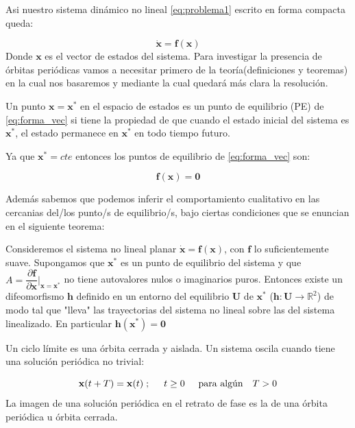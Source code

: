 \documentclass[10pt]{article}
\begin{document}
Asi nuestro sistema dinámico no lineal \eqref{eq:problema1} escrito en forma compacta queda:

\begin{equation}
 \dot{\mathbf{x}}=\mathbf{f}(\mathbf{x}) \label{eq:forma_vec}
\end{equation}
Donde $\mathbf{x}$ es el vector de estados del sistema.
Para investigar la presencia de órbitas periódicas vamos a necesitar primero de la teoría(definiciones y teoremas) en la cual nos basaremos y mediante la cual quedará más clara la resolución.

\begin{defi}
 Un punto $\mathbf{x}=\mathbf{x}^{*}$ en el espacio de estados es un punto de equilibrio (PE) de \eqref{eq:forma_vec} si tiene la propiedad de 
que cuando el estado inicial del sistema es $\mathbf{x}^{*}$, el estado permanece en $\mathbf{x}^{*}$ en todo tiempo futuro.
\end{defi}

Ya que $\mathbf{x}^{*}=cte$ entonces los puntos de equilibrio de \eqref{eq:forma_vec} son:

\begin{equation}
 \mathbf{f}(\mathbf{x})=\mathbf{0} \label{eq:pe}
\end{equation}

Además sabemos que podemos inferir el comportamiento cualitativo en las cercanias del/los punto/s de equilibrio/s, bajo ciertas condiciones 
que se enuncian en el siguiente teorema:

\begin{teo}

Consideremos el sistema no lineal planar $ \dot{\mathbf{x}}=\mathbf{f}(\mathbf{x})$, con $\mathbf{f}$ lo suficientemente suave. Supongamos que $\mathbf{x}^{*}$
es un punto de equilibrio del sistema y que $A=\dfrac{\partial \mathbf{f}}{\partial \mathbf{x}}\bigg\vert_{\mathbf{x}=\mathbf{x}^{*}}$ no tiene autovalores
nulos o imaginarios puros. Entonces existe un difeomorfismo $\mathbf{h}$ definido en un entorno del equilibrio $\mathbf{U}$ de $\mathbf{x}^{*}$ ($\mathbf{h}:\mathbf{U} \longrightarrow \mathbb{R}^{2}$) de modo tal que "lleva"
las trayectorias del sistema no lineal sobre las del sistema linealizado. En particular $\mathbf{h}(\mathbf{x}^{*})=\mathbf{0}$
\label{hart}

\end{teo}

\begin{defi}
Un ciclo límite es una órbita cerrada y aislada. Un sistema oscila cuando tiene una solución periódica no trivial:

\begin{equation}
\mathbf{x}(t+T)=\mathbf{x}(t) \; ; \hspace{.5cm} t\geq 0 \hspace{.5cm} \text{para algún} \quad  T > 0
\end{equation}
La imagen de una solución periódica en el retrato de fase es la de una órbita periódica u órbita cerrada. 
\end{defi}
\end{document}
